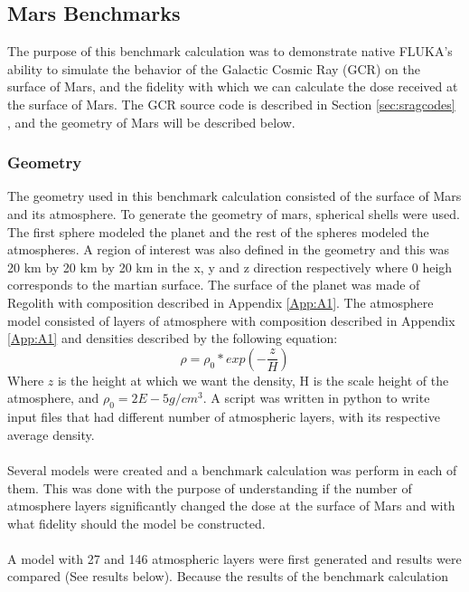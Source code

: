 
\subsection{Mars Benchmarks}

The purpose of this benchmark calculation was to demonstrate native FLUKA's
ability to simulate the behavior of the Galactic Cosmic Ray (GCR) on the surface
of Mars, and the fidelity with which we can calculate the dose received at the
surface of Mars. The GCR source code is described in Section \ref{sec:sragcodes}
, and the geometry of Mars will be described below.

\subsubsection{Geometry}
The geometry used in this benchmark calculation consisted of the surface of Mars
and its atmosphere. To generate the geometry of mars, spherical shells were
used. The first sphere modeled the planet and the rest of the spheres modeled
the atmospheres. A region of interest was also defined in the geometry and this
was 20 km by 20 km by 20 km in the x, y and z direction respectively where 0
heigh corresponds to the martian surface. The surface of the planet was made of
Regolith with composition described in Appendix \ref{App:A1}. The atmosphere
model consisted of layers of atmosphere with composition described in
Appendix \ref{App:A1} and densities described by the following equation:
\begin{equation}
\label{density}
\rho = \rho_0 *exp(- \frac{z}{H})
\end{equation}
Where $z$ is the height at which we want the density, H is the scale height of
the atmosphere, and $\rho_0 = 2E-5 g/cm^3$. A script was written in python to
write input files that had different number of atmospheric layers, with its
respective average density.
\\
\\
Several models were created and a benchmark calculation was perform in each of
them. This was done with the purpose of understanding if the number of
atmosphere layers significantly changed the dose at the surface of Mars
and with what fidelity should the model be constructed.
\\
\\
A model with 27 and 146 atmospheric layers were first generated and results were
compared (See results below).  Because the results of the benchmark calculation
